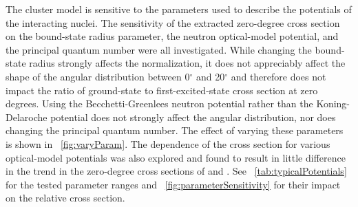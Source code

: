 The cluster model is sensitive to the parameters used to describe the potentials of the interacting nuclei.  The sensitivity of the extracted zero-degree cross section on the bound-state radius parameter, the neutron optical-model potential, and the principal quantum number were all investigated.  While changing the bound-state radius strongly affects the normalization, it does not appreciably affect the shape of the angular distribution between 0$^{\circ}$ and 20$^{\circ}$ and therefore does not impact the ratio of ground-state to first-excited-state cross section at zero degrees.  Using the Becchetti-Greenlees neutron potential rather than the Koning-Delaroche potential does not strongly affect the angular distribution, nor does changing the principal quantum number.  The effect of varying these parameters is shown in {\fig}~\ref{fig:varyParam}.  The dependence of the cross section for various  optical-model potentials was also explored and found to result in little difference in the trend in the zero-degree cross sections of  and .  See {\tab}~\ref{tab:typicalPotentials} for the tested parameter ranges and {\fig}~\ref{fig:parameterSensitivity} for their impact on the relative cross section.
